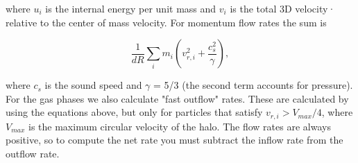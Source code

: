 where $u_i$ is the internal energy per unit mass and $v_i$ is the total 3D velocity·
relative to the center of mass velocity. For momentum flow rates the sum is

\begin{equation}
    \frac{1}{dR} \sum_{i} m_i \left(v_{r,i}^2 + \frac{c_s^2}{\gamma}\right),
\end{equation}

where $c_s$ is the sound speed and $\gamma$ = 5/3 (the second term accounts for pressure). For the gas phases we also calculate "fast outflow" rates. These are calculated by using the equations above, but only for particles that satisfy $v_{r,i} > V_{max} / 4$, where $V_{max}$ is the maximum circular velocity of the halo. The flow rates are always positive, so to compute the net rate you must subtract the inflow rate from the outflow rate.


